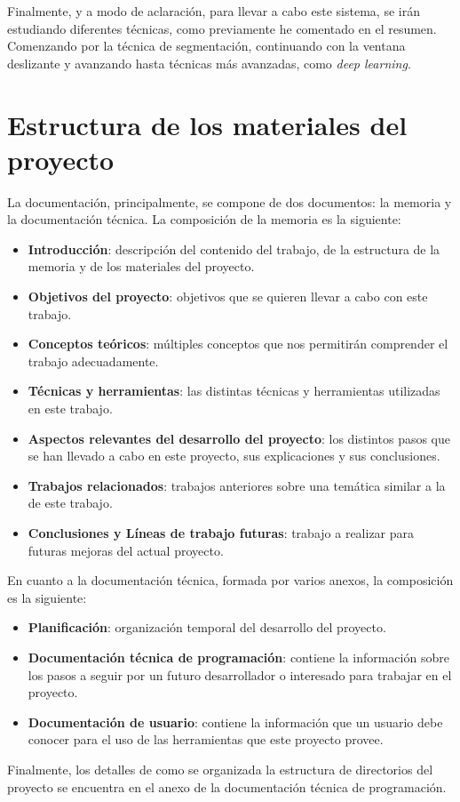 Finalmente, y a modo de aclaración, para llevar a cabo este sistema, se irán estudiando diferentes técnicas, como previamente he comentado en el resumen. Comenzando por la técnica de segmentación, continuando con la ventana deslizante y avanzando hasta técnicas más avanzadas, como \textit{deep learning}.

\section{Estructura de los materiales del proyecto}

La documentación, principalmente, se compone de dos documentos: la memoria y la documentación técnica. La composición de la memoria es la siguiente:

\begin{itemize}
	\item \textbf{Introducción}: descripción del contenido del trabajo, de la estructura de la memoria y de los materiales del proyecto.
	\item \textbf{Objetivos del proyecto}: objetivos que se quieren llevar a cabo con este trabajo.
	\item \textbf{Conceptos teóricos}: múltiples conceptos que nos permitirán comprender el trabajo adecuadamente.
	\item \textbf{Técnicas y herramientas}: las distintas técnicas y herramientas utilizadas en este trabajo.
	\item \textbf{Aspectos relevantes del desarrollo del proyecto}: los distintos pasos que se han llevado a cabo en este proyecto, sus explicaciones y sus conclusiones.
	\item \textbf{Trabajos relacionados}: trabajos anteriores sobre una temática similar a la de este trabajo.
	\item \textbf{Conclusiones y Líneas de trabajo futuras}: trabajo a realizar para futuras mejoras del actual proyecto.
\end{itemize}

En cuanto a la documentación técnica, formada por varios anexos, la composición es la siguiente:

\begin{itemize}
	\item \textbf{Planificación}: organización temporal del desarrollo del proyecto.
	\item \textbf{Documentación técnica de programación}: contiene la información sobre los pasos a seguir por un futuro desarrollador o interesado para trabajar en el proyecto.
	\item \textbf{Documentación de usuario}: contiene la información que un usuario debe conocer para el uso de las herramientas que este proyecto provee.
\end{itemize}

Finalmente, los detalles de como se organizada la estructura de directorios del proyecto se encuentra en el anexo de la documentación técnica de programación.